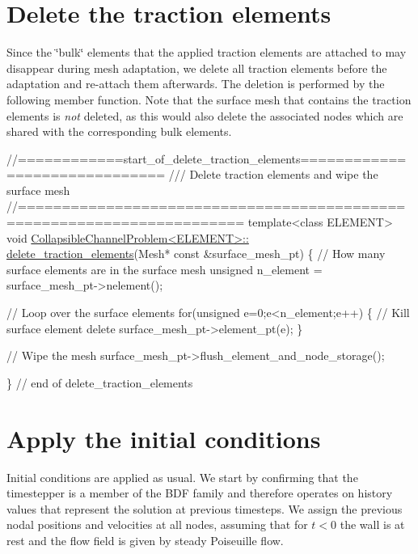  

\hypertarget{index_tractiondel}{}\section{Delete the traction elements}\label{index_tractiondel}
Since the \char`\"{}bulk\char`\"{} elements that the applied traction elements are attached to may disappear during mesh adaptation, we delete all traction elements before the adaptation and re-\/attach them afterwards. The deletion is performed by the following member function. Note that the surface mesh that contains the traction elements is {\itshape not} deleted, as this would also delete the associated nodes which are shared with the corresponding bulk elements.

 
\begin{DoxyCodeInclude}
\textcolor{comment}{//============start\_of\_delete\_traction\_elements==============================}
\textcolor{comment}{/// Delete traction elements and wipe the surface mesh}
\textcolor{comment}{}\textcolor{comment}{//=======================================================================}
\textcolor{keyword}{template}<\textcolor{keyword}{class} ELEMENT>
\textcolor{keywordtype}{void} \hyperlink{classCollapsibleChannelProblem_a6a5324dd1efb8c517a7e4d431b10fca4}{CollapsibleChannelProblem<ELEMENT>::}
\hyperlink{classCollapsibleChannelProblem_a6a5324dd1efb8c517a7e4d431b10fca4}{delete\_traction\_elements}(Mesh* \textcolor{keyword}{const} &surface\_mesh\_pt)
\{
 \textcolor{comment}{// How many surface elements are in the surface mesh}
 \textcolor{keywordtype}{unsigned} n\_element = surface\_mesh\_pt->nelement();

 \textcolor{comment}{// Loop over the surface elements}
 \textcolor{keywordflow}{for}(\textcolor{keywordtype}{unsigned} e=0;e<n\_element;e++)
  \{
   \textcolor{comment}{// Kill surface element}
   \textcolor{keyword}{delete} surface\_mesh\_pt->element\_pt(e);
  \}

 \textcolor{comment}{// Wipe the mesh}
 surface\_mesh\_pt->flush\_element\_and\_node\_storage();

\} \textcolor{comment}{// end of delete\_traction\_elements}

\end{DoxyCodeInclude}




 

\hypertarget{index_IC}{}\section{Apply the initial conditions}\label{index_IC}
Initial conditions are applied as usual. We start by confirming that the timestepper is a member of the {\ttfamily B\+DF} family and therefore operates on history values that represent the solution at previous timesteps. We assign the previous nodal positions and velocities at all nodes, assuming that for $ t< 0 $ the wall is at rest and the flow field is given by steady Poiseuille flow.

